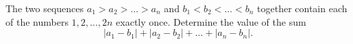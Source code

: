 The two sequences $a_1 > a_2 >\ldots >a_n$ and $b_1 <b_2<\ldots <b_n$ together contain
each of the numbers $1,2,\ldots ,2n$ exactly once. Determine the value of the sum
$$|a_1-b_1|+|a_2-b_2|+\ldots+|a_n-b_n|.$$